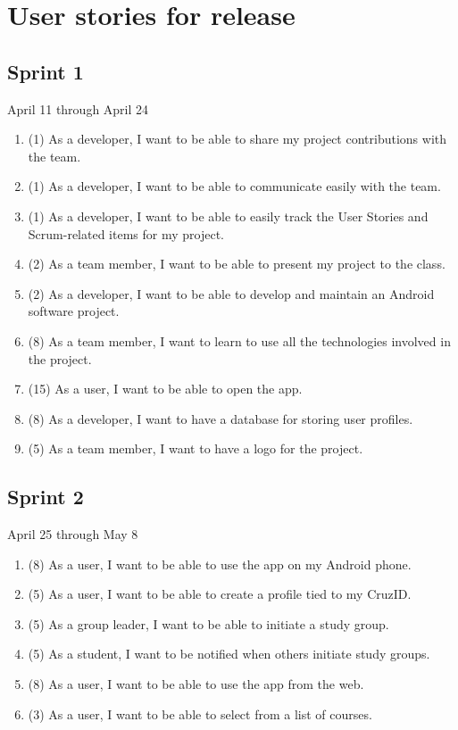 \documentclass[10pt]{article}
\begin{document}
    \section{User stories for release}

    \subsection{Sprint 1}
    April 11 through April 24
    \begin{enumerate}
        \item (1) As a developer, I want to be able to share my project contributions with the team.
        \item (1) As a developer, I want to be able to communicate easily with the team.
        \item (1) As a developer, I want to be able to easily track the User Stories and Scrum-related items for my project.
        \item (2) As a team member, I want to be able to present my project to the class.
        \item (2) As a developer, I want to be able to develop and maintain an Android software project.
        \item (8) As a team member, I want to learn to use all the technologies involved in the project. 
        \item (15) As a user, I want to be able to open the app.
        \item (8) As a developer, I want to have a database for storing user profiles.
        \item (5) As a team member, I want to have a logo for the project.
    \end{enumerate}

    \subsection{Sprint 2}
    April 25 through May 8
    \begin{enumerate}
        \item (8) As a user, I want to be able to use the app on my Android phone.
        \item (5) As a user, I want to be able to create a profile tied to my CruzID.
        \item (5) As a group leader, I want to be able to initiate a study group.
        \item (5) As a student, I want to be notified when others initiate study groups.
        \item (8) As a user, I want to be able to use the app from the web.
        \item (3) As a user, I want to be able to select from a list of courses.
    \end{enumerate}
    
\end{document}

